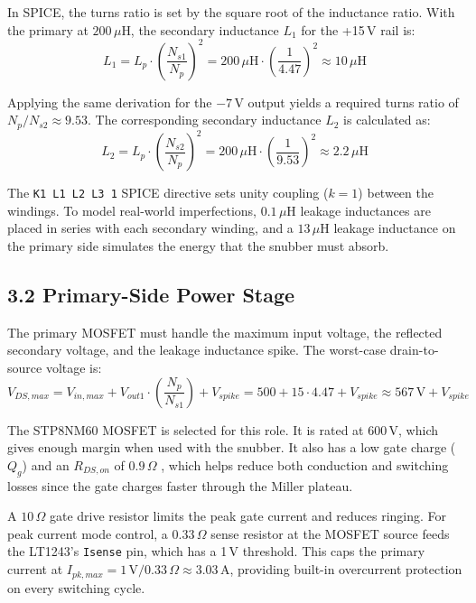 In SPICE, the turns ratio is set by the square root of the inductance ratio. With the primary at $200\,\mu$H, the secondary inductance $L_1$ for the +15\,V rail is:
\begin{equation}
L_1 = L_p \cdot \left(\frac{N_{s1}}{N_p}\right)^2 = 200\,\mu\text{H} \cdot \left(\frac{1}{4.47}\right)^2 \approx 10\,\mu\text{H}
\end{equation}

Applying the same derivation for the $-7$\,V output yields a required turns ratio of $N_p/N_{s2} \approx 9.53$. The corresponding secondary inductance $L_2$ is calculated as:
\begin{equation}
L_2 = L_p \cdot \left(\frac{N_{s2}}{N_p}\right)^2 = 200\,\mu\text{H} \cdot \left(\frac{1}{9.53}\right)^2 \approx 2.2\,\mu\text{H}
\end{equation}

The \texttt{K1 L1 L2 L3 1} SPICE directive sets unity coupling ($k=1$) between the windings. To model real-world imperfections, $0.1\,\mu$H leakage inductances are placed in series with each secondary winding, and a $13\,\mu$H leakage inductance on the primary side simulates the energy that the snubber must absorb.

\subsection*{3.2 Primary-Side Power Stage}

The primary MOSFET must handle the maximum input voltage, the reflected secondary voltage, and the leakage inductance spike. The worst-case drain-to-source voltage is:
\begin{equation}
V_{DS,max} = V_{in,max} + V_{out1} \cdot \left(\frac{N_p}{N_{s1}}\right) + V_{spike} = 500 + 15 \cdot 4.47 + V_{spike} \approx 567\,\text{V} + V_{spike}
\end{equation}

The STP8NM60 MOSFET is selected for this role. It is rated at 600\,V, which gives enough margin when used with the snubber. It also has a low gate charge ($Q_g$) and an $R_{DS,on}$ of $0.9\,\Omega$ , which helps reduce both conduction and switching losses since the gate charges faster through the Miller plateau.

A $10\,\Omega$ gate drive resistor limits the peak gate current and reduces ringing. For peak current mode control, a $0.33\,\Omega$ sense resistor at the MOSFET source feeds the LT1243's \texttt{Isense} pin, which has a 1\,V threshold. This caps the primary current at $I_{pk,max} = 1\,\text{V} / 0.33\,\Omega \approx 3.03\,\text{A}$, providing built-in overcurrent protection on every switching cycle.

